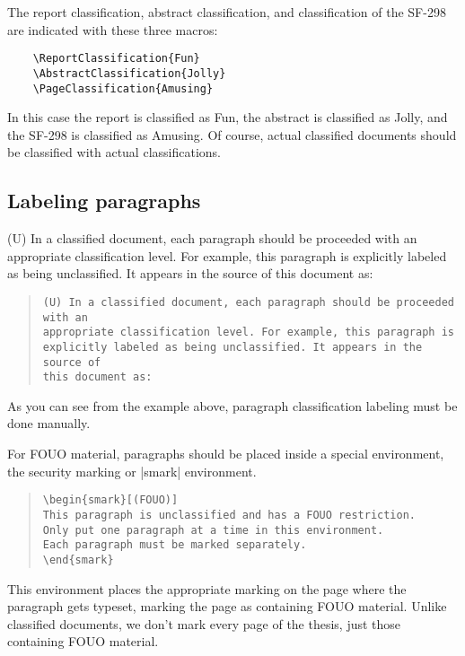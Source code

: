 The report classification, abstract classification, and classification
of the SF-298 are indicated with these three macros:
\begin{Verbatim}
    \ReportClassification{Fun}
    \AbstractClassification{Jolly}
    \PageClassification{Amusing}
\end{Verbatim}

In this case the report is classified as Fun, the abstract is classified
as Jolly, and the SF-298 is classified as Amusing. Of course, actual 
classified documents should be classified with actual classifications.


\subsection{Labeling paragraphs}
(U) In a classified document, each paragraph should be proceeded with an
appropriate classification level. For example, this paragraph is
explicitly labeled as being unclassified. It appears in the source of
this document as:

\begin{quotation}
\begin{Verbatim}[fontsize=\small]
(U) In a classified document, each paragraph should be proceeded with an
appropriate classification level. For example, this paragraph is
explicitly labeled as being unclassified. It appears in the source of
this document as:
\end{Verbatim}
\end{quotation}

As you can see from the example above, paragraph classification
labeling must be done manually.

For FOUO material, paragraphs should be placed inside a special
environment, the security marking or |smark| environment.
\begin{quotation}
\begin{Verbatim}[fontsize=\small]
\begin{smark}[(FOUO)]
This paragraph is unclassified and has a FOUO restriction.
Only put one paragraph at a time in this environment.
Each paragraph must be marked separately.
\end{smark}
\end{Verbatim}
\end{quotation}

This environment places the appropriate marking on the page where
the paragraph gets typeset, marking the page as containing FOUO material. 
Unlike classified documents, we don't mark every page of the thesis, just
those containing FOUO material. 

